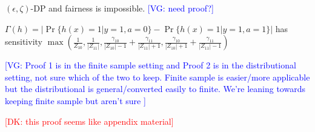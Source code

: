 \documentclass[format = sigconf]{acmart}
\newcommand{\dk}[1]{\textcolor{red}{[DK: #1]}}
\newcommand{\vg}[1]{\textcolor{blue}{[VG: #1]}}
\newcommand{\1}{\mathbbm{1}}
\newcommand{\eps}{\epsilon}
\newcommand{\zt}{\zeta}
\newcommand{\z}[1]{Z_{#1}}
\theoremstyle{definition}
\begin{document}
\begin{lemma}
  $(\eps, \zt)$-DP and fairness is impossible. \vg{need proof?}
\end{lemma}




\begin{corollary} $\Gamma(h) = |\Pr\{h(x) = 1 | y=1, a =0\} - \Pr\{h(x) = 1 | y = 1, a = 1\}|$ has sensitivity $\max(\frac{1}{\z{10}},\frac{1}{|Z_{11}|}, \frac{\gamma_{10}}{|\z{10}|-1} + \frac{\gamma_{11}}{|Z_{11}|+1}, \frac{\gamma_{10}}{|\z{10}|+1} + \frac{\gamma_{11}}{|Z_{11}|-1})$
\end{corollary}

\vg{Proof 1 is in the finite sample setting and Proof 2 is in the
distributional setting, not sure which of the two to keep. Finite
sample is easier/more applicable but the distributional is
general/converted easily to finite. We're leaning towards keeping
finite sample but aren't sure }

\dk{this proof seems like appendix material}
\end{document}
